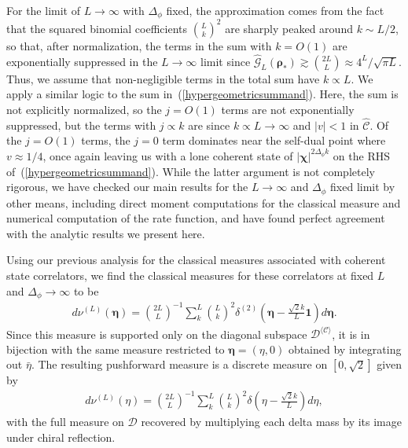 \documentclass[a4paper,11pt]{article}
\theoremstyle{plain}
\theoremstyle{definition}
\theoremstyle{remark}
\newcommand{\bs}[1]{\boldsymbol{#1}}
\newcommand{\ba}{\begin{equation} \begin{aligned}}
\newcommand{\ea}{\end{aligned} \end{equation}}
\newcommand{\Df}{\Delta_\phi}
\begin{document}
For the limit of $L\to \infty$ with $\Df$ fixed, the approximation comes from the fact that the squared binomial coefficients $\binom{L}{k}^2$ are sharply peaked around $k \sim L/2$, so that, after normalization, the terms in the sum with $k = O(1) $ are exponentially suppressed in the $L\to\infty$ limit since $\widehat{\mathcal{G}}_L(\bs{\rho}_*) \gtrsim \binom{2L}{L} \approx 4^L/\sqrt{\pi L}$. Thus, we assume that non-negligible terms in the total sum have $ k \propto L$. We apply a similar logic to the sum in~(\ref{hypergeometricsummand}). Here, the sum is not explicitly normalized, so the $j = O(1)$ terms are not exponentially suppressed, but the terms with $j \propto k$ are since $k \propto L \to \infty$ and $|v| < 1$ in $\widehat{\mathscr{C}}$. Of the $j = O(1)$ terms, the $j = 0$ term dominates near the self-dual point where $v \approx 1/4$, once again leaving us with a lone coherent state of $|\bs{\chi}|^{2\Df k}$ on the RHS of~(\ref{hypergeometricsummand}). While the latter argument is not completely rigorous, we have checked our main results for the $L\to \infty$ and $\Df$ fixed limit by other means, including direct moment computations for the classical measure and numerical computation of the rate function, and have found perfect agreement with the analytic results we present here.

Using our previous analysis for the classical measures associated with coherent state correlators, we find the classical measures for these correlators at fixed $L$ and $\Df \to \infty$ to be
\ba
d\nu^{(L)}(\bs{\eta}) = \binom{2L}{L}^{-1} \sum_k^L  \binom{L}{k}^2\delta^{(2)}\left(\bs{\eta}- \frac{\sqrt{2} k}{L}\bs{1} \right) d\bs{\eta}.
\ea
Since this measure is supported only on the diagonal subspace $\mathcal{D}^{\langle\mathcal{C}\rangle}$, it is in bijection with the same measure restricted to $\bs{\eta} = (\eta,0)$ obtained by integrating out $\bar{\eta}$. The resulting pushforward measure is a discrete measure on $[0,\sqrt{2}]$ given by
\ba
d\nu^{(L)}(\eta)=\binom{2L}{L}^{-1} \sum_k^L  \binom{L}{k}^2\delta\left(\eta- \frac{\sqrt{2} k}{L} \right) d\eta,
\ea
with the full measure on $\mathcal{D}$ recovered by multiplying each delta mass by its image under chiral reflection. 
\end{document}
